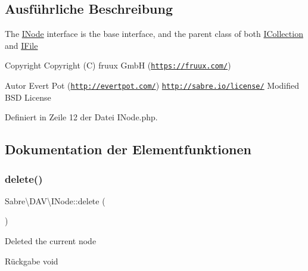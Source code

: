 \subsection{Ausführliche Beschreibung}
The \mbox{\hyperlink{interface_sabre_1_1_d_a_v_1_1_i_node}{I\+Node}} interface is the base interface, and the parent class of both \mbox{\hyperlink{interface_sabre_1_1_d_a_v_1_1_i_collection}{I\+Collection}} and \mbox{\hyperlink{interface_sabre_1_1_d_a_v_1_1_i_file}{I\+File}}

\begin{DoxyCopyright}{Copyright}
Copyright (C) fruux GmbH (\href{https://fruux.com/}{\tt https\+://fruux.\+com/}) 
\end{DoxyCopyright}
\begin{DoxyAuthor}{Autor}
Evert Pot (\href{http://evertpot.com/}{\tt http\+://evertpot.\+com/})  \href{http://sabre.io/license/}{\tt http\+://sabre.\+io/license/} Modified B\+SD License 
\end{DoxyAuthor}


Definiert in Zeile 12 der Datei I\+Node.\+php.



\subsection{Dokumentation der Elementfunktionen}
\mbox{\label{interface_sabre_1_1_d_a_v_1_1_i_node_a72cd0ee4e36dfced2b0412d14dbd73e6}} 
\subsubsection{\texorpdfstring{delete()}{delete()}}
{\footnotesize\ttfamily Sabre\textbackslash{}\+D\+A\+V\textbackslash{}\+I\+Node\+::delete (\begin{DoxyParamCaption}{ }\end{DoxyParamCaption})}

Deleted the current node

\begin{DoxyReturn}{Rückgabe}
void 
\end{DoxyReturn}


